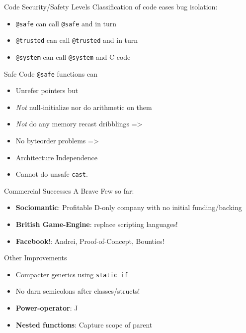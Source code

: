 \documentclass[xcolor=dvipsnames]{beamer}
\begin{document}
\begin{frame}[fragile]{Code Security/Safety Levels}
  Classification of code eases bug isolation:
  \begin{itemize}[<+->]
  \item \texttt{@safe} can call \texttt{@safe} and in turn
  \item \texttt{@trusted} can call \texttt{@trusted} and in turn
  \item \texttt{@system} can call \texttt{@system} and C code
  \end{itemize}
\end{frame}

\begin{frame}[fragile]{Safe Code}
  \texttt{@safe} functions can
  \begin{itemize}[<+->]
  \item Unrefer pointers but
  \item \emph{Not} null-initialize nor do arithmetic on them
  \item \emph{Not} do any memory recast dribblings =>
  \item No byteorder problems =>
  \item Architecture Independence
  \item Cannot do unsafe \texttt{cast}.
  \end{itemize}
\end{frame}

\begin{frame}[fragile]{Commercial Successes}
  A Brave Few so far:
  \begin{itemize}[<+->]
  \item \textbf{Sociomantic}: Profitable D-only company with no initial
    funding/backing
  \item \textbf{British Game-Engine}: replace scripting languages!
  \item \textbf{Facebook}!: Andrei, Proof-of-Concept, Bounties!
  \end{itemize}
\end{frame}

\begin{frame}[fragile]{Other Improvements}
  \begin{itemize}[<+->]
  \item Compacter generics using \texttt{static if}
  \item No darn semicolons after classes/structs!
  \item \textbf{Power-operator}: ^^
  \item \textbf{Nested functions}: Capture scope of parent
  \end{itemize}
\end{frame}
\end{document}
